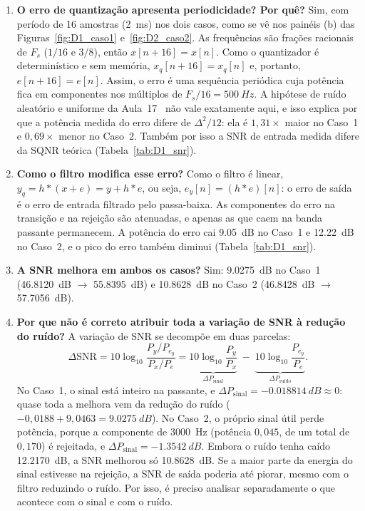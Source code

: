\documentclass[11pt,a4paper]{article}
\begin{document}
\begin{enumerate}[leftmargin=1.6em, itemsep=3pt]
    \item \textbf{O erro de quantização apresenta periodicidade? Por quê?}
    Sim, com período de 16 amostras (\SI{2}{ms}) nos dois casos, como se vê nos painéis (b) das Figuras~\ref{fig:D1_caso1} e~\ref{fig:D2_caso2}. As frequências são frações racionais de $F_s$ ($1/16$ e $3/8$), então $x[n + 16] = x[n]$. Como o quantizador é determinístico e sem memória, $x_q[n + 16] = x_q[n]$ e, portanto, $e[n + 16] = e[n]$. Assim, o erro é uma sequência periódica cuja potência fica em componentes nos múltiplos de $F_s/16 = \SI{500}{Hz}$. A hipótese de ruído aleatório e uniforme da Aula~17~\cite{aula17} não vale exatamente aqui, e isso explica por que a potência medida do erro difere de $\Delta^2/12$: ela é $1,31\times$ maior no Caso~1 e $0,69\times$ menor no Caso~2. Também por isso a SNR de entrada medida difere da SQNR teórica (Tabela~\ref{tab:D1_snr}).

    \item \textbf{Como o filtro modifica esse erro?}
    Como o filtro é linear, $y_q = h * (x + e) = y + h * e$, ou seja, $e_y[n] = (h * e)[n]$: o erro de saída é o erro de entrada filtrado pelo passa-baixa. As componentes do erro na transição e na rejeição são atenuadas, e apenas as que caem na banda passante permanecem. A potência do erro cai \SI{9,05}{dB} no Caso~1 e \SI{12,22}{dB} no Caso~2, e o pico do erro também diminui (Tabela~\ref{tab:D1_snr}).

    \item \textbf{A SNR melhora em ambos os casos?}
    Sim: \SI{+9,0275}{dB} no Caso~1 (\SI{46,8120}{dB} $\rightarrow$ \SI{55,8395}{dB}) e \SI{+10,8628}{dB} no Caso~2 (\SI{46,8428}{dB} $\rightarrow$ \SI{57,7056}{dB}).

    \item \textbf{Por que não é correto atribuir toda a variação de SNR à redução do ruído?}
    A variação de SNR se decompõe em duas parcelas:
    \begin{equation}
        \Delta\text{SNR} = 10\log_{10}\frac{P_y/P_{e_y}}{P_x/P_e} = \underbrace{10\log_{10}\frac{P_y}{P_x}}_{\Delta P_{\text{sinal}}} \;-\; \underbrace{10\log_{10}\frac{P_{e_y}}{P_e}}_{\Delta P_{\text{ruído}}}.
        \label{eq:deltasnr}
    \end{equation}
    No Caso~1, o sinal está inteiro na passante, e $\Delta P_{\text{sinal}} = \SI{-0,018814}{dB} \approx 0$: quase toda a melhora vem da redução do ruído ($-0,0188 + 9,0463 = \SI{+9,0275}{dB}$). No Caso~2, o próprio sinal útil perde potência, porque a componente de \SI{3000}{Hz} (potência $0,045$, de um total de $0,170$) é rejeitada, e $\Delta P_{\text{sinal}} = \SI{-1,3542}{dB}$. Embora o ruído tenha caído \SI{12,2170}{dB}, a SNR melhorou só \SI{+10,8628}{dB}. Se a maior parte da energia do sinal estivesse na rejeição, a SNR de saída poderia até piorar, mesmo com o filtro reduzindo o ruído. Por isso, é preciso analisar separadamente o que acontece com o sinal e com o ruído.
\end{enumerate}
\end{document}
